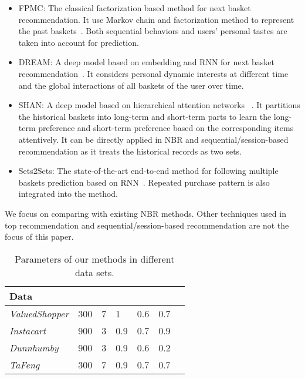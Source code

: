 \documentclass[sigconf]{acmart}
\begin{document}
\begin{itemize}

\item{FPMC:} The classical  factorization based method for next basket recommendation. It use Markov chain and factorization method to represent the past baskets~\cite{rendle2010factorizing}. Both sequential behaviors and users' personal tastes are taken into account for prediction. 
\item{DREAM:} A  deep model based on embedding and RNN for next basket  recommendation~\cite{yu2016dynamic}. It considers  personal dynamic interests at different time and the global interactions of all baskets of the user over time. 
\item{SHAN:} A deep model based on  hierarchical attention networks~\cite{ying2018sequential} . It partitions  the historical baskets into long-term and short-term parts to learn the long-term preference and short-term preference  based on the corresponding items attentively. It can be directly applied in  NBR and sequential/session-based recommendation as it treats the historical records as two sets. 
\item{Sets2Sets:} The state-of-the-art  end-to-end method for  following multiple baskets prediction based on RNN~\cite{hu2019sets2sets}. Repeated purchase pattern is also integrated into the method. 
\end{itemize}

We focus on comparing with existing
 NBR methods. Other  techniques used in   top   recommendation and  sequential/session-based recommendation are not the focus of this paper.


\begin{table}[ht]
\small
\centering
\caption{Parameters of our methods in different data sets.}
\begin{tabularx}{\linewidth}{lXXXXXX}
\toprule
\textbf{Data}& &  & &  &\\
\midrule
\emph{ValuedShopper} &300 &7  &1&0.6 &0.7 \\
\emph{Instacart}&900 & 3 &0.9  &0.7  & 0.9\\
\emph{Dunnhumby} &900 &3 &0.9  &0.6 &0.2 \\
\emph{TaFeng} &300 &7 &0.9  &0.7 &0.7 \\
\bottomrule
\end{tabularx}
\label{tab:param}
\end{table}
\end{document}
